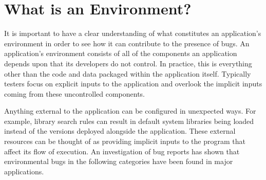 \section{What is an Environment?}
\label{SEC:background}

It is important
to have a clear understanding
of what constitutes an application's environment
in order to see how it can contribute to the presence of bugs.
An application's environment consists of
all of the components an application depends upon
that its developers do not control.
In practice, this is everything other than the code and data packaged
within the application itself.
Typically testers
focus on explicit inputs to the application
and overlook the implicit inputs
coming from these uncontrolled components.

Anything external to the application can be
configured in unexpected ways.
For example, library search rules can result in default system libraries
being loaded instead of
the versions deployed alongside the application.
These external resources can be thought of as
providing implicit inputs to the program that affect its flow of execution.
An investigation of bug reports has shown that environmental bugs in the
following categories have been found in major applications.

